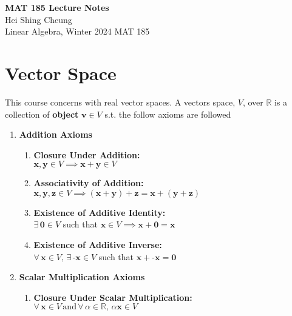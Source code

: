 \documentclass[11pt]{article}
\begin{document}
\thispagestyle{empty}
{\LARGE \bf MAT 185 Lecture Notes}\\
{\large Hei Shing Cheung}\\
Linear Algebra, Winter 2024 \hfill MAT 185\\
\section{Vector Space}
\begin{definition}
    This course concerns with real vector spaces. A vectors space, ${V}$, over $\mathbb{R}$ is a collection of \textbf{object} $\textbf{v} \in V$ s.t. the follow axioms are followed
    \begin{enumerate}
        \item \textbf{Addition Axioms}
        \begin{enumerate}
            \item \textbf{Closure Under Addition:} \\
            $\textbf{x}, \textbf{y} \in V \implies \textbf{x} + \textbf{y} \in V$
            
            \item \textbf{Associativity of Addition:} \\
            $\textbf{x}, \textbf{y}, \textbf{z} \in V \implies (\textbf{x} + \textbf{y}) + \textbf{z} = \textbf{x} + (\textbf{y} + \textbf{z})$
            
            \item \textbf{Existence of Additive Identity:} \\
            $\exists \, \textbf{0} \in V$ such that $\textbf{x} \in V \implies \textbf{x} + \textbf{0} = \textbf{x}$
            
            \item \textbf{Existence of Additive Inverse:} \\
            $\forall \, \textbf{x} \in V, \, \exists \, \textbf{-x} \in V$ such that $\textbf{x} + \textbf{-x} = \textbf{0}$
        \end{enumerate}
        
        \item \textbf{Scalar Multiplication Axioms}
        \begin{enumerate}
            \item \textbf{Closure Under Scalar Multiplication:} \\
            $\forall \, \textbf{x} \in V \, \text{and} \, \forall \, \alpha \in \mathbb{R}, \, \alpha \textbf{x} \in V$
            

\end{enumerate}
\end{enumerate}
\end{definition}
\end{document}
